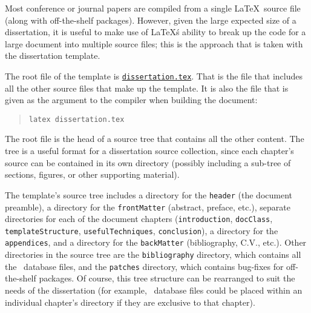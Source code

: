 Most conference or journal papers are compiled from a single \LaTeX\ source file (along with off-the-shelf packages).
However, given the large expected size of a dissertation, it is useful to make use of \LaTeX\'s ability to break up the code for a large document into multiple source files; this is the approach that is taken with the dissertation template.

The root file of the template is \href{./dissertation.tex}{\texttt{dissertation.tex}}.
That is the file that includes all the other source files that make up the template.
It is also the file that is given as the argument to the compiler when building the document:
\begin{quotation}%
\texttt{latex dissertation.tex}
\end{quotation}%

The root file is the head of a source tree that contains all the other content.
The tree is a useful format for a dissertation source collection, since each chapter's source can be contained in its own directory (possibly including a sub-tree of sections, figures, or other supporting material).

The template's source tree includes a directory for the \texttt{header} (the document preamble), a directory for the \texttt{frontMatter} (abstract, preface, etc.), separate directories for each of the document chapters (\texttt{introduction}, \texttt{docClass}, \texttt{templateStructure}, \texttt{usefulTechniques}, \texttt{conclusion}), a directory for the \texttt{ap\-pendices}, and a directory for the \texttt{backMatter} (bibliography, C.V., etc.).
Other directories in the source tree are the \texttt{bibliography} directory, which contains all the \BibTeX\ database files, and the \texttt{patches} directory, which contains bug-fixes for off-the-shelf packages.
Of course, this tree structure can be rearranged to suit the needs of the dissertation (for example, \BibTeX\ database files could be placed within an individual chapter's directory if they are exclusive to that chapter).


